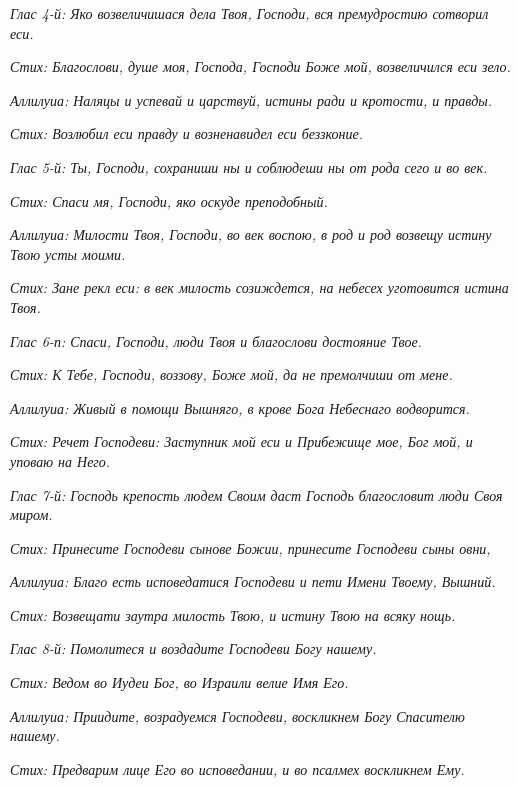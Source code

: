 \itshape Глас 4-й:\normalfont{} Яко возвеличишася дела Твоя, Господи, вся премудростию сотворил еси.


\itshape Стих:\normalfont{} Благослови, душе моя, Господа, Господи Боже мой, возвеличился еси зело.


\itshape Аллилуиа:\normalfont{} Наляцы и успевай и царствуй, истины ради и кротости, и правды.


\itshape Стих:\normalfont{} Возлюбил еси правду и возненавидел еси беззконие.


\itshape Глас 5-й:\normalfont{} Ты, Господи, сохраниши ны и соблюдеши ны от рода сего и во век.


\itshape Стих:\normalfont{} Спаси мя, Господи, яко оскуде преподобный.


\itshape Аллилуиа:\normalfont{} Милости Твоя, Господи, во век воспою, в род и род возвещу истину Твою усты моими.


\itshape Стих:\normalfont{} Зане рекл еси: в век милость созиждется, на небесех уготовится истина Твоя.


\itshape Глас 6-п:\normalfont{} Спаси, Господи, люди Твоя и благослови достояние Твое.


\itshape Стих:\normalfont{} К Тебе, Господи, воззову, Боже мой, да не премолчиши от мене.


\itshape Аллилуиа:\normalfont{} Живый в помощи Вышняго, в крове Бога Небеснаго водворится.


\itshape Стих:\normalfont{} Речет Господеви: Заступник мой еси и Прибежище мое, Бог мой, и уповаю на Него.


\itshape Глас 7-й:\normalfont{} Господь крепость людем Своим даст Господь благословит люди Своя миром.


\itshape Стих:\normalfont{} Принесите Господеви сынове Божии, принесите Господеви сыны овни,


\itshape Аллилуиа:\normalfont{} Благо есть исповедатися Господеви и пети Имени Твоему, Вышний.


\itshape Стих:\normalfont{} Возвещати заутра милость Твою, и истину Твою на всяку нощь.


\itshape Глас 8-й:\normalfont{} Помолитеся и воздадите Господеви Богу нашему.


\itshape Стих:\normalfont{} Ведом во Иудеи Бог, во Израили велие Имя Его.


\itshape Аллилуиа:\normalfont{} Приидите, возрадуемся Господеви, воскликнем Богу Спасителю нашему.


\itshape Стих:\normalfont{} Предварим лице Его во исповедании, и во псалмех воскликнем Ему.




